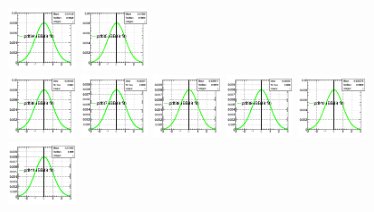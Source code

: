 \begin{spacing}{2}
\begin{figure}[!htbp]
{{\includegraphics[width=0.16\textwidth]{fig/posteriors__pdf34_BB18_fitBBBE161718_ADDGRW.png}
\includegraphics[width=0.16\textwidth]{fig/posteriors__pdf35_BB18_fitBBBE161718_ADDGRW.png}\\
\includegraphics[width=0.16\textwidth]{fig/posteriors__pdf36_BB18_fitBBBE161718_ADDGRW.png}
\includegraphics[width=0.16\textwidth]{fig/posteriors__pdf37_BB18_fitBBBE161718_ADDGRW.png}
\includegraphics[width=0.16\textwidth]{fig/posteriors__pdf38_BB18_fitBBBE161718_ADDGRW.png}
\includegraphics[width=0.16\textwidth]{fig/posteriors__pdf39_BB18_fitBBBE161718_ADDGRW.png}
\includegraphics[width=0.16\textwidth]{fig/posteriors__pdf40_BB18_fitBBBE161718_ADDGRW.png}\\
\includegraphics[width=0.16\textwidth]{fig/posteriors__pdf41_BB18_fitBBBE161718_ADDGRW.png}
}}
\end{figure}
\end{spacing}
